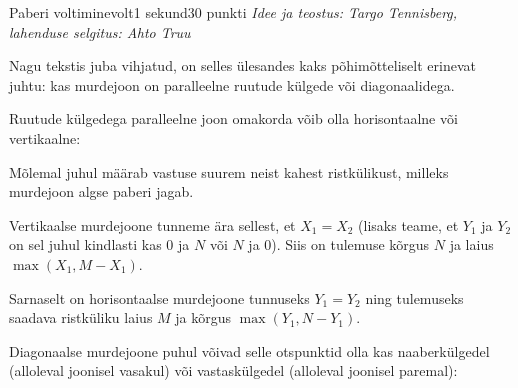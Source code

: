 \begin{yl}{3}{Paberi voltimine}{volt}{1 sekund}{30 punkti}
  \emph{Idee ja teostus: Targo Tennisberg, lahenduse selgitus: Ahto Truu}

  Nagu tekstis juba vihjatud, on selles ülesandes kaks põhimõtteliselt erinevat juhtu: kas murdejoon on paralleelne ruutude külgede või diagonaalidega.

  Ruutude külgedega paralleelne joon omakorda võib olla horisontaalne või vertikaalne:
  \begin{center}
  \hspace{1cm}
  \end{center}

  Mõlemal juhul määrab vastuse suurem neist kahest ristkülikust, milleks murdejoon algse paberi jagab.

  Vertikaalse murdejoone tunneme ära sellest, et $X_1 = X_2$ (lisaks teame, et $Y_1$ ja $Y_2$ on sel juhul kindlasti kas $0$ ja $N$ või $N$ ja $0$). Siis on tulemuse kõrgus $N$ ja laius $\max(X_1, M - X_1)$.

  Sarnaselt on horisontaalse murdejoone tunnuseks $Y_1 = Y_2$ ning tulemuseks saadava ristküliku laius $M$ ja kõrgus $\max(Y_1, N - Y_1)$.

  Diagonaalse murdejoone puhul võivad selle otspunktid olla kas naaberkülgedel (alloleval joonisel vasakul) või vastaskülgedel (alloleval joonisel paremal):
  \begin{center}
  \hspace{1cm}
  \end{center}


\end{yl}
